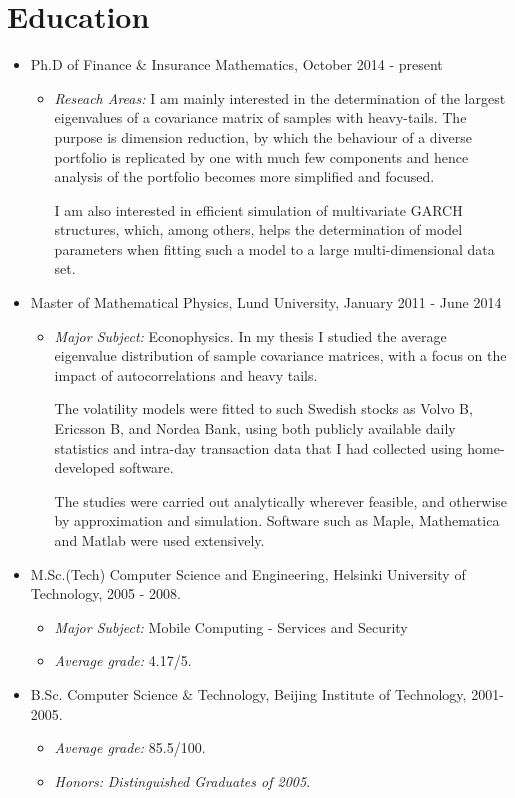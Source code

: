 \documentclass[10pt,letterpaper]{article}
\begin{document}
\section*{Education}
\begin{itemize}
\item Ph.D of Finance \& Insurance Mathematics, October 2014 - present
  \begin{itemize}
    \item {\it Reseach Areas:} I am mainly interested in the
      determination of the largest eigenvalues of a covariance matrix
      of samples with heavy-tails. The purpose is dimension
      reduction, by which the behaviour of a diverse portfolio is
      replicated by one with much few components and hence analysis of
      the portfolio becomes more simplified and focused.

      I am also interested in efficient simulation of multivariate
      GARCH structures, which, among others, helps the determination of
      model parameters when fitting such a model to a large
      multi-dimensional data set.
  \end{itemize}  

\item Master of Mathematical Physics, Lund University, January 2011 -
  June 2014
  \begin{itemize}
  \item {\it Major Subject:} Econophysics. In my thesis I studied the
    average eigenvalue distribution of sample covariance matrices,
    with a focus on the impact of autocorrelations and heavy tails.

    The volatility models were fitted to such Swedish stocks as Volvo B,
    Ericsson B, and Nordea Bank, using both publicly available daily
    statistics and intra-day transaction data that I had collected
    using home-developed software.

    The studies were carried out analytically wherever feasible, and
    otherwise by approximation and simulation. Software such as Maple,
    Mathematica and Matlab were used extensively.
  \end{itemize}

\item M.Sc.(Tech) Computer Science and Engineering, Helsinki
  University of Technology, 2005 - 2008.
  \begin{itemize}
  \item {\it Major Subject:} Mobile Computing - Services and Security
  \item {\it Average grade:} 4.17/5.
  \end{itemize}

\item B.Sc. Computer Science \& Technology, Beijing Institute of
  Technology, 2001- 2005.
  \begin{itemize}
  \item {\it Average grade:} 85.5/100.
  \item {\it Honors:} \textit{Distinguished Graduates of 2005}.
  \end{itemize}
\end{itemize}
\end{document}
